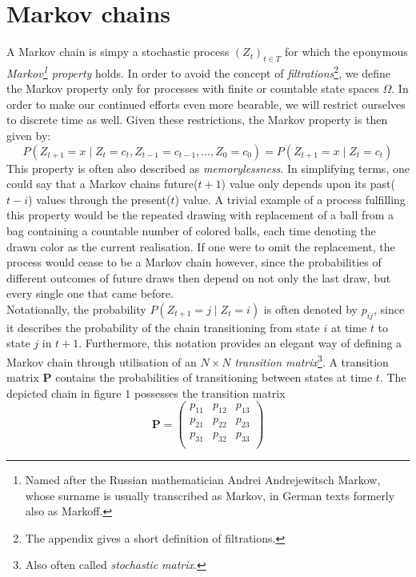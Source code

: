 \documentclass[12pt]{article}
\begin{document}
\section{Markov chains}
A Markov chain is simpy a stochastic process $(Z_t)_{t \in T}$ for which the eponymous \textit{Markov\footnote{Named after the Russian mathematician Andrei Andrejewitsch Markow, whose surname is usually transcribed as Markov, in German texts formerly also as Markoff.} property} holds. In order to avoid the concept of \textit{filtrations}\footnote{The appendix gives a short definition of filtrations.}, we define the Markov property only for processes with finite or countable state spaces $\Omega$. In order to make our continued efforts even more bearable, we will restrict ourselves to discrete time as well. Given these restrictions, the Markov property is then given by:
\[
P(Z_{t+1} = x \mid Z_t = c_t, Z_{t-1} = c_{t-1}, \dots , Z_0 = c_0) = P(Z_{t+1} = x \mid Z_t = c_t)
\]
This property is often also described as \textit{memorylessness}. In simplifying terms, one could say that a Markov chains future($t+1$) value only depends upon its past($t-i$) values through the present($t$) value. A trivial example of a process fulfilling this property would be the repeated drawing with replacement of a ball from a bag containing a countable number of colored balls, each time denoting the drawn color as the current realisation. If one were to omit the replacement, the process would cease to be a Markov chain however, since the probabilities of different outcomes of future draws then depend on not only the last draw, but every single one that came before. \\
Notationally, the probability $P(Z_{t+1} = j \mid Z_t = i)$ is often denoted by $p_{ij}$, since it describes the probability of the chain transitioning from state $i$ at time $t$ to state $j$ in $t+1$. Furthermore, this notation provides an elegant way of defining a Markov chain through utilisation of an $N \times N$ \textit{transition matrix}\footnote{Also often called \textit{stochastic matrix}.}. A transition matrix $\textbf{P}$ contains the probabilities of transitioning between states at time $t$. The depicted chain in figure $1$ possesses the transition matrix
\[
\textbf{P} = \left( \begin{array}{rrrr}p_{11} & p_{12} & p_{13}  \\p_{21} & p_{22} & p_{23} \\p_{31} & p_{32} & p_{33} \\\end{array}\right)
\]
\end{document}
